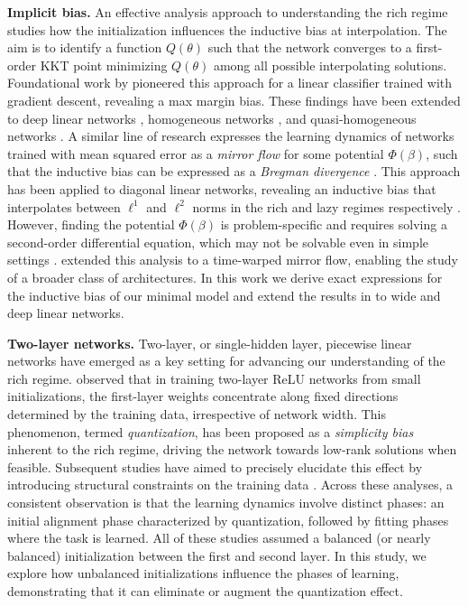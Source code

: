 \documentclass{article}
\theoremstyle{plain}
\theoremstyle{definition}
\theoremstyle{remark}
\begin{document}
\textbf{Implicit bias.}
%
An effective analysis approach to understanding the rich regime studies how the initialization influences the inductive bias at interpolation. 
%
The aim is to identify a function $Q(\theta)$ such that the network converges to a first-order KKT point minimizing $Q(\theta)$ among all possible interpolating solutions.
%
Foundational work by \citet{soudry2018implicit} pioneered this approach for a linear classifier trained with gradient descent, revealing a max margin bias.
%
These findings have been extended to deep linear networks \cite{ji2018gradient, gunasekar2018implicit, moroshko2020implicit}, homogeneous networks \cite{lyu2019gradient, nacson2019lexicographic, chizat2020implicit}, and quasi-homogeneous networks \cite{kunin2022asymmetric}.
%
A similar line of research expresses the learning dynamics of networks trained with mean squared error as a \emph{mirror flow} for some potential $\Phi(\beta)$, such that the inductive bias can be expressed as a \emph{Bregman divergence} \cite{gunasekar2018characterizing}.
%
This approach has been applied to diagonal linear networks, revealing an inductive bias that interpolates between $\ell^1$ and $\ell^2$ norms in the rich and lazy regimes respectively \cite{woodworth2020kernel}.
%
However, finding the potential $\Phi(\beta)$ is problem-specific and requires solving a second-order differential equation, which may not be solvable even in simple settings \cite{gunasekar2021mirrorless, li2022implicit}.
%
\citet{azulay2021implicit} extended this analysis to a time-warped mirror flow, enabling the study of a broader class of architectures.
%
In this work we derive exact expressions for the inductive bias of our minimal model and extend the results in \citet{azulay2021implicit} to wide and deep linear networks.


\textbf{Two-layer networks.}
%
Two-layer, or single-hidden layer, piecewise linear networks have emerged as a key setting for advancing our understanding of the rich regime.
%
\citet{maennel2018gradient} observed that in training two-layer ReLU networks from small initializations, the first-layer weights concentrate along fixed directions determined by the training data, irrespective of network width.
%
This phenomenon, termed \emph{quantization}, has been proposed as a \emph{simplicity bias} inherent to the rich regime, driving the network towards low-rank solutions when feasible. 
%
Subsequent studies have aimed to precisely elucidate this effect by introducing structural constraints on the training data \cite{phuong2020inductive, lyu2021gradient, boursier2022gradient, wang2022early, min2023early, wang2024understanding}.
%
Across these analyses, a consistent observation is that the learning dynamics involve distinct phases: an initial alignment phase characterized by quantization, followed by fitting phases where the task is learned. 
%
All of these studies assumed a balanced (or nearly balanced) initialization between the first and second layer.
%
In this study, we explore how unbalanced initializations influence the phases of learning, demonstrating that it can eliminate or augment the quantization effect.
\end{document}

